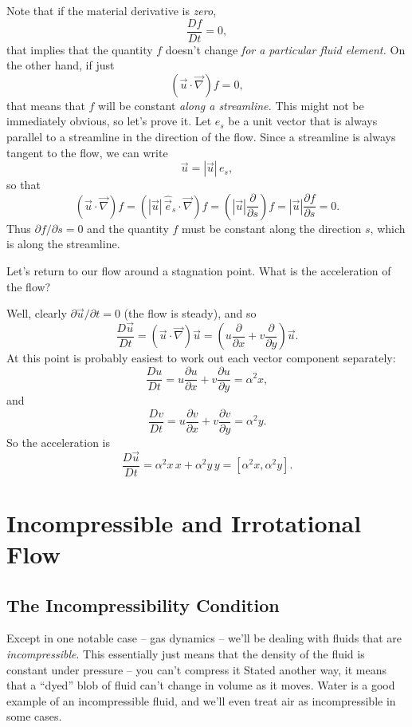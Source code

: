 Note that if the material derivative is \emph{zero},
\[
\frac{Df}{Dt} = 0,
\]
that implies that the quantity $f$ doesn't change \emph{for a particular fluid element.}  On the other hand, if just
\[
(\vec{u} \cdot \vec{\nabla}) f = 0,
\]
that means that $f$ will be constant \emph{along a streamline.}  This might not be immediately obvious, so let's prove it.  Let $\unit{e}_s$ be a unit vector that is always parallel to a streamline in the direction of the flow.  Since a streamline is always tangent to the flow, we can write
\[
\vec{u} = |\vec{u}| \, \unit{e}_s,
\]
so that
\[
(\vec{u} \cdot \vec{\nabla}) f = (|\vec{u}| \, \hat{\vec{e}}_s \cdot \vec{\nabla}) f = (|\vec{u}| \frac{\partial }{\partial s} )f = |\vec{u}| \frac{\partial f}{\partial s} = 0.
\]
Thus $\partial f / \partial s = 0$ and the quantity $f$ must be constant along the direction $s$, which is along the streamline.

\begin{example}
Let's return to our flow around a stagnation point.  What is the acceleration of the flow?

Well, clearly $\partial \vec{u} /\partial t = 0$ (the flow is steady), and so
\[
\frac{D \vec{u}}{Dt} = (\vec{u} \cdot \vec{\nabla} ) \vec{u} = \left( u \frac{\partial}{\partial x} + v\frac{\partial}{\partial y} \right) \vec{u}.
\]
At this point is probably easiest to work out each vector component separately:
\[
\frac{D u}{Dt} =  u \frac{\partial u}{\partial x} + v\frac{\partial u}{\partial y}  = \alpha^2 x,
\]
and
\[
\frac{D v}{Dt} =  u \frac{\partial v}{\partial x} + v\frac{\partial v}{\partial y}  = \alpha^2 y.
\]
So the acceleration is
\[
\frac{D \vec{u}}{Dt} = \alpha^2 x \, \unit{x} + \alpha^2 y \, \unit{y} = [\alpha^2 x, \alpha^2 y].
\]

\end{example}

%
%
%

\section{Incompressible and Irrotational Flow}

\subsection{The Incompressibility Condition}
\label{sec_incompressibility}

Except in one notable case -- gas dynamics -- we'll be dealing with fluids that are \emph{incompressible}.  This essentially just means that the density of the fluid is constant under pressure -- you can't compress it  Stated another way, it means that a ``dyed'' blob of fluid can't change in volume as it moves.  Water is a good example of an incompressible fluid, and we'll even treat air as incompressible in some cases.

